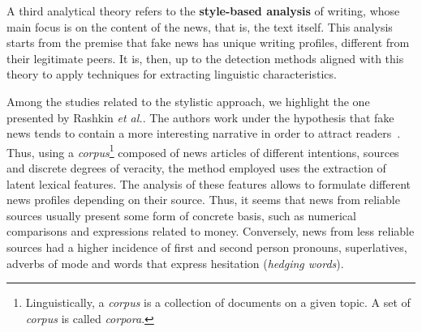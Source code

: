 \documentclass{ieeeaccess}
\begin{document}

A third analytical theory refers to the \textbf{style-based analysis} of writing, whose main focus is on the content of the news, that is, the text itself. This analysis starts from the premise that fake news has unique writing profiles, different from their legitimate peers. It is, then, up to the detection methods aligned with this theory to apply techniques for extracting linguistic characteristics.



Among the studies related to the stylistic approach, we highlight the one presented by Rashkin \textit{et al.}. The authors work under the hypothesis that fake news tends to contain a more interesting narrative in order to attract readers~\cite{rashkin2017truth}. Thus, using a \textit{corpus}\footnote{Linguistically, a \textit{corpus} is a collection of documents on a given topic. A set of \textit{corpus} is called \textit{corpora}.} composed of news articles of different intentions, sources and discrete degrees of veracity, the method employed uses the extraction of latent lexical features. The analysis of these features allows to formulate different news profiles depending on their source. Thus, it seems that news from reliable sources usually present some form of concrete basis, such as numerical comparisons and expressions related to money. Conversely, news from less reliable sources had a higher incidence of first and second person pronouns, superlatives, adverbs of mode and words that express hesitation (\textit{hedging words}). %
\end{document}
